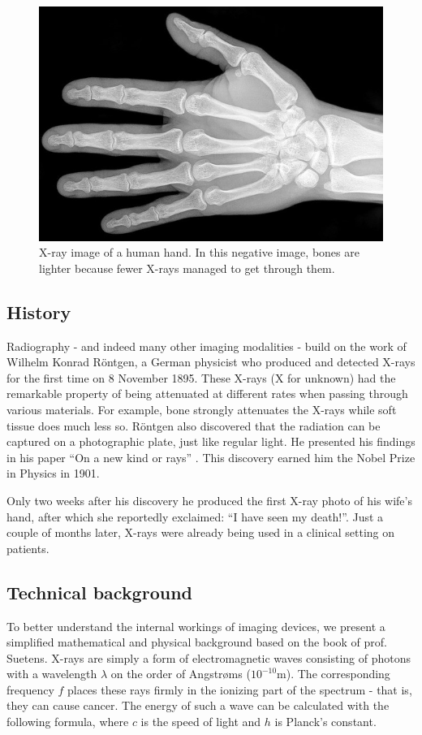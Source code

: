 \begin{figure}[ht]
\begin{center}
  \includegraphics[width=\linewidth]{img/xrayhand.jpg}
  \caption{X-ray image of a human hand. In this negative image, bones are
  lighter because fewer X-rays managed to get through them.}
  \label{fig:xrayhand}
\end{center}
\end{figure}

\subsection{History}
Radiography - and indeed many other imaging modalities - build on the work of
Wilhelm Konrad R\"ontgen, a German physicist who produced and detected X-rays
for the first time on 8 November 1895. These X-rays (X for unknown) had the
remarkable property of being attenuated at different rates when passing through
various materials. For example, bone strongly attenuates the X-rays while soft
tissue does much less so. R\"ontgen also discovered that the radiation can be
captured on a photographic plate, just like regular light. He presented his
findings in his paper ``On a new kind or rays'' \cite{rontgen}. This discovery
earned him the Nobel Prize in Physics in 1901.

Only two weeks after his discovery he produced the first X-ray photo of his
wife's hand, after which she reportedly exclaimed: ``I have seen my death!''.
Just a couple of months later, X-rays were already being used in a clinical
setting on patients.

\subsection{Technical background}
To better understand the internal workings of imaging devices, we present a
simplified mathematical and physical background based on the book of prof.
Suetens\cite{suetens}. X-rays are simply a form of electromagnetic waves
consisting of photons with a wavelength $\lambda$ on the order of Angstr\o ms
($10^{-10}$m). The corresponding frequency $f$ places these rays firmly in the
ionizing part of the spectrum - that is, they can cause cancer. The energy of
such a wave can be calculated with the following formula, where $c$ is the
speed of light and $h$ is Planck's constant.

